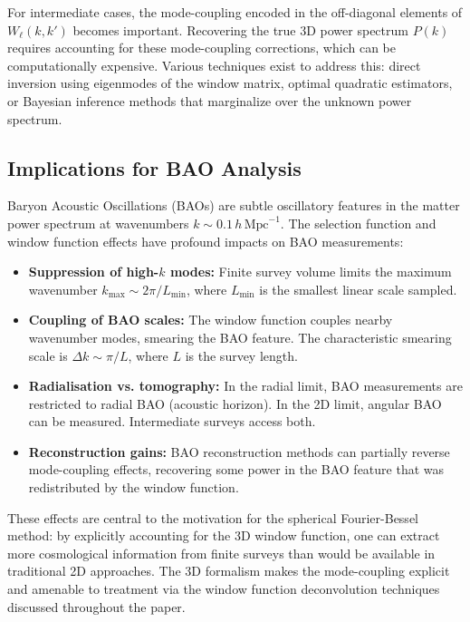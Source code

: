 For intermediate cases, the mode-coupling encoded in the off-diagonal elements of $W_\ell(k, k')$ becomes important. Recovering the true 3D power spectrum $P(k)$ requires accounting for these mode-coupling corrections, which can be computationally expensive. Various techniques exist to address this: direct inversion using eigenmodes of the window matrix, optimal quadratic estimators, or Bayesian inference methods that marginalize over the unknown power spectrum.

\subsection{Implications for BAO Analysis}

Baryon Acoustic Oscillations (BAOs) are subtle oscillatory features in the matter power spectrum at wavenumbers $k \sim 0.1 \, h \, \text{Mpc}^{-1}$. The selection function and window function effects have profound impacts on BAO measurements:

\begin{itemize}
\item \textbf{Suppression of high-$k$ modes:} Finite survey volume limits the maximum wavenumber $k_{\max} \sim 2\pi / L_{\min}$, where $L_{\min}$ is the smallest linear scale sampled.
\item \textbf{Coupling of BAO scales:} The window function couples nearby wavenumber modes, smearing the BAO feature. The characteristic smearing scale is $\Delta k \sim \pi / L$, where $L$ is the survey length.
\item \textbf{Radialisation vs. tomography:} In the radial limit, BAO measurements are restricted to radial BAO (acoustic horizon). In the 2D limit, angular BAO can be measured. Intermediate surveys access both.
\item \textbf{Reconstruction gains:} BAO reconstruction methods can partially reverse mode-coupling effects, recovering some power in the BAO feature that was redistributed by the window function.
\end{itemize}

These effects are central to the motivation for the spherical Fourier-Bessel method: by explicitly accounting for the 3D window function, one can extract more cosmological information from finite surveys than would be available in traditional 2D approaches. The 3D formalism makes the mode-coupling explicit and amenable to treatment via the window function deconvolution techniques discussed throughout the paper.

